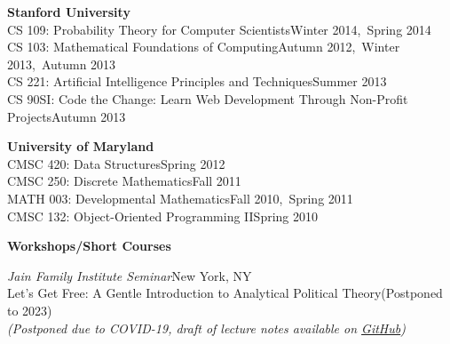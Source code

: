 \documentclass[letterpaper,11pt]{article}
\begin{document}
        \noindent\begin{minipage}{\textwidth}\noindent\textbf{Stanford University}\vspace{2mm}\\
                    CS 109: Probability Theory for Computer Scientists\hfill{}Winter 2014,~Spring 2014\vspace{1mm}\\            CS 103: Mathematical Foundations of Computing\hfill{}Autumn 2012,~Winter 2013,~Autumn 2013\vspace{1mm}\\            CS 221: Artificial Intelligence Principles and Techniques\hfill{}Summer 2013\vspace{1mm}\\            CS 90SI: Code the Change: Learn Web Development Through Non-Profit Projects\hfill{}Autumn 2013\vspace{2mm} \\    \end{minipage}
        \noindent\begin{minipage}{\textwidth}\noindent\textbf{University of Maryland}\vspace{2mm}\\
                    CMSC 420: Data Structures\hfill{}Spring 2012\vspace{1mm}\\            CMSC 250: Discrete Mathematics\hfill{}Fall 2011\vspace{1mm}\\            MATH 003: Developmental Mathematics\hfill{}Fall 2010,~Spring 2011\vspace{1mm}\\            CMSC 132: Object-Oriented Programming II\hfill{}Spring 2010\vspace{2mm} \\    \end{minipage}
            
\textbf{Workshops/Short Courses}\vspace{2mm}
	
	\textit{Jain Family Institute Seminar}\hfill New York, NY\vspace{2mm}\\
	Let's Get Free: A Gentle Introduction to Analytical Political Theory\hfill (Postponed to 2023)\vspace{1mm}\\
	\-\hspace{8mm}\textit{\small (Postponed due to COVID-19, draft of lecture notes available on \href{https://github.com/jpowerj/lets-get-free}{GitHub})}\vspace{2mm}\\
\end{document}
